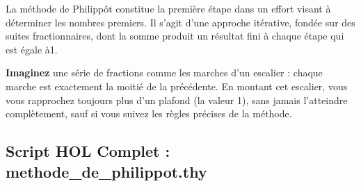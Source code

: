 \documentclass[a4paper,11pt]{article}
\newenvironment{resume}{%
    \begin{tcolorbox}[colback=purple!5,colframe=holpurple,title={\textbf{Résumé visuel}}]
}{%
    \end{tcolorbox}
}
\begin{document}
La méthode de Philippôt constitue la première étape dans un effort visant à déterminer les nombres premiers. Il s'agit d'une approche itérative, fondée sur des suites fractionnaires, dont la somme produit un résultat fini à chaque étape qui est égale à1.

\begin{resume}
\textbf{Imaginez} une série de fractions comme les marches d'un escalier : chaque marche est exactement la moitié de la précédente. En montant cet escalier, vous vous rapprochez toujours plus d'un plafond (la valeur 1), sans jamais l'atteindre complètement, sauf si vous suivez les règles précises de la méthode.
\end{resume}

\subsection{Script HOL Complet : methode\_de\_philippot.thy}
\end{document}
